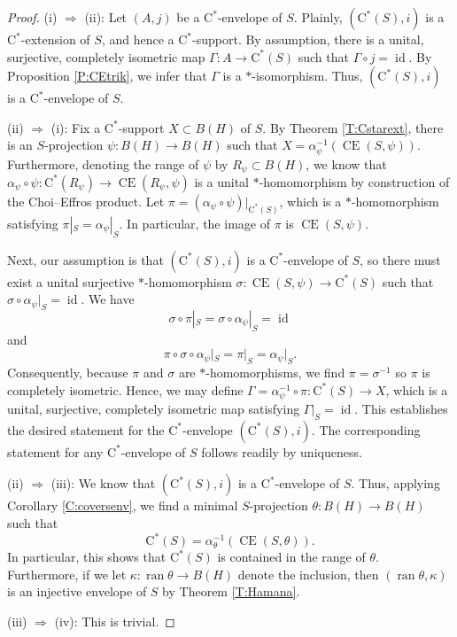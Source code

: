 \documentclass[10pt,a4paper]{amsart}
\newcommand{\CE}{\operatorname{CE}}
\newcommand{\id}{\operatorname{id}}
\newcommand{\rC}{\mathrm{C}}
\newcommand{\ran}{\operatorname{ran}}
\begin{document}
\begin{proof}
(i) $\Rightarrow$ (ii): Let $(A,j)$ be a $\rC^*$-envelope of $S$. Plainly,  $(\rC^*(S),i)$ is a $\rC^*$-extension of $S$, and hence a $\rC^*$-support. By assumption, there is a unital, surjective, completely isometric map $\Gamma:A\to \rC^*(S)$ such that $\Gamma\circ j=\id$. By Proposition \ref{P:CEtrik}, we infer that $\Gamma$ is a $*$-isomorphism. Thus, $(\rC^*(S),i)$ is a  $\rC^*$-envelope of $S$.


(ii) $\Rightarrow$ (i):  Fix a $\rC^*$-support $X\subset B(H)$ of $S$. By Theorem \ref{T:Cstarext}, there is an $S$-projection $\psi:B(H)\to B(H)$ such that $X=\alpha_\psi^{-1}(\CE(S,\psi))$. Furthermore, denoting the range of $\psi$ by $R_\psi\subset B(H)$, we know that $\alpha_\psi\circ \psi:\rC^*(R_\psi)\to \CE(R_\psi,\psi)$ is a unital  $*$-homomorphism by construction of the Choi--Effros product. Let $\pi=(\alpha_\psi\circ \psi)|_{\rC^*(S)}$, which is a $*$-homomorphism satisfying $\pi|_S=\alpha_\psi|_S$. In particular, the image of $\pi$ is $\CE(S,\psi)$. 

Next, our assumption is that $(\rC^*(S),i)$ is a $\rC^*$-envelope of $S$, so there must exist a unital surjective $*$-homomorphism $\sigma:\CE(S,\psi)\to \rC^*(S)$ such that $\sigma \circ \alpha_\psi|_S=\id$. We have
\[
\sigma\circ \pi|_S=\sigma\circ \alpha_\psi|_S=\id 
\]
and
\[
\pi\circ \sigma\circ \alpha_\psi|_S=\pi|_S=\alpha_\psi|_S.
\]
Consequently, because $\pi$ and $\sigma$ are $*$-homomorphisms, we find $\pi=\sigma^{-1}$ so $\pi$ is completely isometric.
Hence, we may define $\Gamma=\alpha_\psi^{-1}\circ \pi:\rC^*(S)\to X$, which is a unital, surjective, completely isometric map satisfying $\Gamma|_S=\id$.  This establishes the desired statement for the $\rC^*$-envelope $(\rC^*(S),i)$. The corresponding statement for any $\rC^*$-envelope of $S$ follows readily by uniqueness.

(ii) $\Rightarrow$ (iii): We know that $(\rC^*(S),i)$ is a $\rC^*$-envelope of $S$. Thus, applying Corollary \ref{C:coversenv}, we find a minimal $S$-projection $\theta:B(H)\to B(H)$ such that  \[\rC^*(S)=\alpha_\theta ^{-1}(\CE(S,\theta)).\] In particular, this shows that $\rC^*(S)$ is contained in the range of $\theta$. Furthermore, if we let $\kappa:\ran\theta\to B(H)$ denote the inclusion, then $(\ran \theta, \kappa)$  is an injective envelope of $S$ by Theorem \ref{T:Hamana}.

(iii) $\Rightarrow$ (iv): This is trivial. 


\end{proof}
\end{document}
